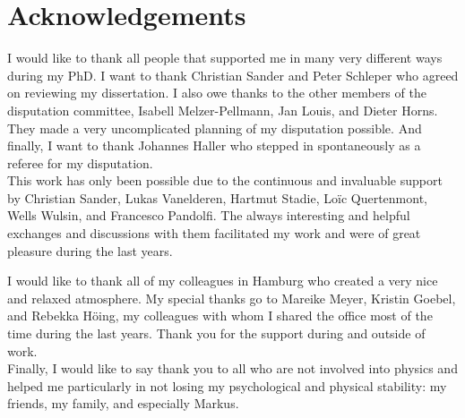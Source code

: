 \chapter*{Acknowledgements}
\vspace{1cm}

I would like to thank all people that supported me in many very different ways during my PhD.
I want to thank Christian Sander and Peter Schleper who agreed on reviewing my dissertation.
I also owe thanks to the other members of the disputation committee, Isabell Melzer-Pellmann, Jan Louis, and Dieter Horns.
They made a very uncomplicated planning of my disputation possible.
And finally, I want to thank Johannes Haller who stepped in spontaneously as a referee for my disputation.\\

This work has only been possible due to the continuous and invaluable support by Christian Sander, Lukas Vanelderen, Hartmut Stadie, Lo\"{i}c Quertenmont, Wells Wulsin, and Francesco Pandolfi.
The always interesting and helpful exchanges and discussions with them facilitated my work and were of great pleasure during the last years.

I would like to thank all of my colleagues in Hamburg who created a very nice and relaxed atmosphere. 
My special thanks go to Mareike Meyer, Kristin Goebel, and Rebekka H\"{o}ing, my colleagues with whom I shared the office most of the time during the last years. 
Thank you for the support during and outside of work.\\

Finally, I would like to say thank you to all who are not involved into physics and helped me particularly in not losing my psychological and physical stability: my friends, my family, and especially Markus.
